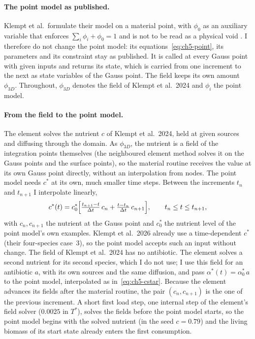\paragraph{The point model as published.}
Klempt et al.\ formulate their model on a material point, with $\phi_0$ as an auxiliary variable that
enforces $\sum_i\phi_i+\phi_0=1$ and is not to be read as a physical void
\cite{Klempt2026ContinuumBacterialGrowth}. I therefore do not change the point model: its
equations~\eqref{eq:ch5-point}, its parameters and its constraint stay as published. It is called at
every Gauss point with given inputs and returns its state, which is carried from one increment to the
next as state variables of the Gauss point. The field keeps its own amount $\phi_{3D}$. Throughout,
$\phi_{3D}$ denotes the field of Klempt et al.\ 2024 and $\phi_i$ the point model.

\paragraph{From the field to the point model.}
The element solves the nutrient $c$ of Klempt et al.\ 2024, held at given sources and diffusing through
the domain. As $\phi_{3D}$, the nutrient is a field of the integration points themselves (the
neighboured element method solves it on the Gauss points and the surface points), so the material
routine receives the value at its own Gauss point directly, without an interpolation from nodes. The point model needs $c^*$ at its own, much smaller time steps.
Between the increments $t_n$ and $t_{n+1}$ I interpolate linearly,
\begin{equation}
c^*(t)=c^*_0\Bigl[\tfrac{t_{n+1}-t}{\Delta t}\,c_n+\tfrac{t-t_n}{\Delta t}\,c_{n+1}\Bigr],
\qquad t_n\le t\le t_{n+1},
\label{eq:ch5-cstar}
\end{equation}
with $c_n,c_{n+1}$ the nutrient at the Gauss point and $c^*_0$ the nutrient level of the point model's
own examples. Klempt et al.\ 2026 already use a time-dependent $c^*$ (their four-species case~3), so
the point model accepts such an input without change. The field of Klempt et al.\ 2024 has no
antibiotic. The element solves a second nutrient for its second species, which I do not use; I use this
field for an antibiotic $a$, with its own sources and the same diffusion, and pass
$\alpha^*(t)=\alpha^*_0\,a$ to the point model, interpolated as in~\eqref{eq:ch5-cstar}. Because the
element advances its fields after the material routine, the pair $(c_n,c_{n+1})$ is the one of the
previous increment. A short first load step, one internal step of the element's field solver
($0.0025$ in $T^*$), solves the fields before the point model starts, so the point model begins with the
solved nutrient (in the seed $c=0.79$) and the living biomass of its start state already enters the
first consumption.

